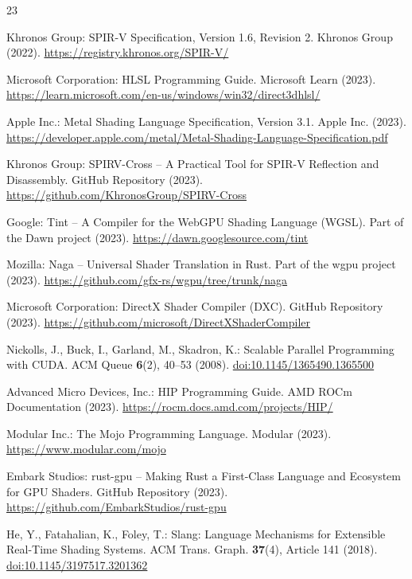 \documentclass{svproc}
\begin{document}
\begin{thebibliography}{23}

Khronos Group: SPIR-V Specification, Version 1.6, Revision 2.
Khronos Group (2022).
\url{https://registry.khronos.org/SPIR-V/}

Microsoft Corporation: HLSL Programming Guide.
Microsoft Learn (2023).
\url{https://learn.microsoft.com/en-us/windows/win32/direct3dhlsl/}

Apple Inc.: Metal Shading Language Specification, Version 3.1.
Apple Inc. (2023).
\url{https://developer.apple.com/metal/Metal-Shading-Language-Specification.pdf}

Khronos Group: SPIRV-Cross -- A Practical Tool for SPIR-V Reflection and Disassembly.
GitHub Repository (2023).
\url{https://github.com/KhronosGroup/SPIRV-Cross}

Google: Tint -- A Compiler for the WebGPU Shading Language (WGSL).
Part of the Dawn project (2023).
\url{https://dawn.googlesource.com/tint}

Mozilla: Naga -- Universal Shader Translation in Rust.
Part of the wgpu project (2023).
\url{https://github.com/gfx-rs/wgpu/tree/trunk/naga}

Microsoft Corporation: DirectX Shader Compiler (DXC).
GitHub Repository (2023).
\url{https://github.com/microsoft/DirectXShaderCompiler}

Nickolls, J., Buck, I., Garland, M., Skadron, K.: Scalable Parallel Programming with CUDA.
ACM Queue \textbf{6}(2), 40--53 (2008).
\url{doi:10.1145/1365490.1365500}

Advanced Micro Devices, Inc.: HIP Programming Guide.
AMD ROCm Documentation (2023).
\url{https://rocm.docs.amd.com/projects/HIP/}

Modular Inc.: The Mojo Programming Language.
Modular (2023).
\url{https://www.modular.com/mojo}

Embark Studios: rust-gpu -- Making Rust a First-Class Language and Ecosystem for GPU Shaders.
GitHub Repository (2023).
\url{https://github.com/EmbarkStudios/rust-gpu}

He, Y., Fatahalian, K., Foley, T.: Slang: Language Mechanisms for Extensible Real-Time Shading Systems.
ACM Trans. Graph. \textbf{37}(4), Article 141 (2018).
\url{doi:10.1145/3197517.3201362}


\end{thebibliography}
\end{document}
